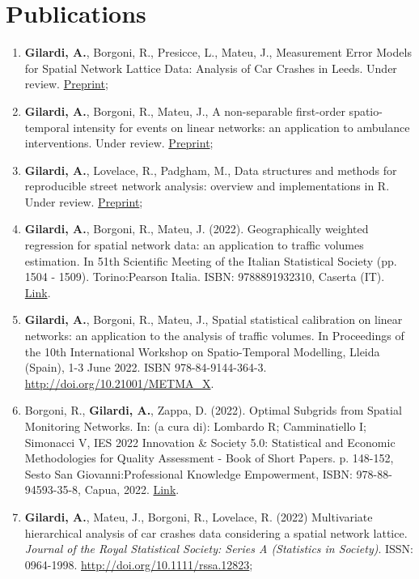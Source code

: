 \documentclass[11pt,a4paper,sans]{moderncv}
\begin{document}
  \section{Publications}
  \begin{enumerate}
  	\item \textbf{Gilardi, A.}, Borgoni, R., Presicce, L., Mateu, J., Measurement Error Models for Spatial Network Lattice Data: Analysis of Car Crashes in Leeds. Under review. \href{https://arxiv.org/pdf/2201.02394.pdf}{Preprint};
  \item \textbf{Gilardi, A.}, Borgoni, R., Mateu, J., A non-separable first-order spatio-temporal intensity for events on linear networks: an application to ambulance interventions. Under review. \href{https://arxiv.org/abs/2106.00457}{Preprint};    
  \item \textbf{Gilardi, A.}, Lovelace, R., Padgham, M., Data structures and methods for reproducible street network analysis: overview and implementations in R. Under review. \href{https://osf.io/78yub}{Preprint};
  \item \textbf{Gilardi, A.}, Borgoni, R., Mateu, J. (2022). Geographically weighted regression for spatial
  network data: an application to traffic volumes
  estimation. In 51th Scientific Meeting of the Italian Statistical Society (pp. 1504 - 1509). Torino:Pearson Italia. ISBN: 9788891932310, Caserta (IT). \href{https://it.pearson.com/content/dam/region-core/italy/pearson-italy/pdf/Docenti/Universit%C3%A0/Sis-2022-4c-low.pdf}{Link}. 
  \item \textbf{Gilardi, A.}, Borgoni, R., Mateu, J., Spatial statistical calibration on linear networks: an application to the analysis of traffic volumes. In Proceedings of the 10th International Workshop on Spatio-Temporal Modelling, Lleida (Spain), 1-3 June 2022. ISBN 978-84-9144-364-3. \url{http://doi.org/10.21001/METMA\_X}. 
  \item Borgoni, R., \textbf{Gilardi, A.}, Zappa, D. (2022). Optimal Subgrids from Spatial Monitoring Networks. In: (a cura di): Lombardo R; Camminatiello I; Simonacci V, IES 2022 Innovation \& Society 5.0: Statistical and Economic Methodologies for Quality Assessment - Book of Short Papers. p. 148-152, Sesto San Giovanni:Professional Knowledge Empowerment, ISBN: 978-88-94593-35-8, Capua, 2022.  \href{https://drive.google.com/file/d/1HEZG50lecMyx_NDRLi2Y7d0papiX9ZWO/view}{Link}.
  \item \textbf{Gilardi, A.}, Mateu, J., Borgoni, R., Lovelace, R. (2022) Multivariate hierarchical analysis of car crashes data considering a spatial network lattice. \textit{Journal of the Royal Statistical Society: Series A (Statistics in Society)}. ISSN: 0964-1998. \url{ http://doi.org/10.1111/rssa.12823};

\end{enumerate}
\end{document}
